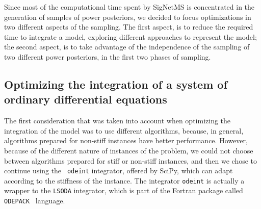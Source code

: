 Since most of the computational time spent by SigNetMS is concentrated
in the generation of samples of power posteriors, we decided to focus
optimizations in two different aspects of the sampling. The first
aspect, is to reduce the required time to integrate a model, exploring
different approaches to represent the model; the second aspect, is to
take advantage of the independence of the sampling of two different
power posteriors, in the first two phases of sampling.

\subsection{Optimizing the integration of a system of ordinary
differential equations}
The first consideration that was taken into account when optimizing the
integration of the model was to use different algorithms, because, in 
general, algorithms prepared for non-stiff instances have better 
performance. However, because of the different nature of instances of 
the problem, we could not choose between algorithms prepared for stiff 
or non-stiff instances, and then we chose to continue using the {\tt
odeint} integrator, offered by SciPy, which can adapt according to the
stiffness of the instance. The integrator {\tt odeint} is actually a 
wrapper to the {\tt LSODA} integrator, which is part of the Fortran
package called {\tt ODEPACK}~\cite{Hindmarsh1982} language.

